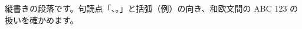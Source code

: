 \documentclass{ltjtarticle}
\begin{document}
縦書きの段落です。句読点「、。」と括弧（例）の向き、和欧文間の ABC 123 の扱いを確かめます。
\end{document}
